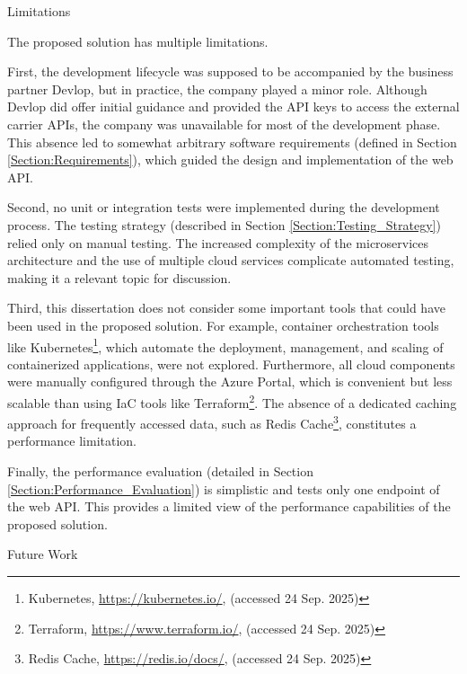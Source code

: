 \documentclass[12pt, reqno, oneside]{amsbook}
\makeatletter
\def\section{\@startsection{section}{1}%
      \z@{.5\linespacing\@plus.7\linespacing}{.25\linespacing}%
      {\normalfont\bfseries\flushleft}}
\theoremstyle{definition}
\theoremstyle{definition}
\numberwithin{section}{chapter}
\numberwithin{table}{chapter}
\numberwithin{figure}{chapter}
\makeatother
\begin{document}
\section{Limitations}
\label{Section:Limitations}

The proposed solution has multiple limitations.

First, the development lifecycle was supposed to be accompanied by the business partner Devlop, but in practice, the company played a minor role. Although Devlop did offer initial guidance and provided the \ac{API} keys to access the external carrier \acp{API}, the company was unavailable for most of the development phase. This absence led to somewhat arbitrary software requirements (defined in Section \ref{Section:Requirements}), which guided the design and implementation of the web \ac{API}.

Second, no unit or integration tests were implemented during the development process. The testing strategy (described in Section \ref{Section:Testing_Strategy}) relied only on manual testing. The increased complexity of the microservices architecture and the use of multiple cloud services complicate automated testing, making it a relevant topic for discussion.

Third, this dissertation does not consider some important tools that could have been used in the proposed solution. For example, container orchestration tools like Kubernetes\footnote{Kubernetes, \url{https://kubernetes.io/}, (accessed 24 Sep. 2025)}, which automate the deployment, management, and scaling of containerized applications, were not explored. Furthermore, all cloud components were manually configured through the Azure Portal, which is convenient but less scalable than using \ac{IaC} tools like Terraform\footnote{Terraform, \url{https://www.terraform.io/}, (accessed 24 Sep. 2025)}. The absence of a dedicated caching approach for frequently accessed data, such as Redis Cache\footnote{Redis Cache, \url{https://redis.io/docs/}, (accessed 24 Sep. 2025)}, constitutes a performance limitation.

Finally, the performance evaluation (detailed in Section \ref{Section:Performance_Evaluation}) is simplistic and tests only one endpoint of the web \ac{API}. This provides a limited view of the performance capabilities of the proposed solution.

\pagebreak

\section{Future Work}
\label{Section:Future_Work}
\end{document}
